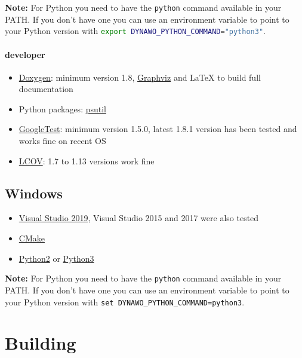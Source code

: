 \documentclass[a4paper, 12pt]{report}
\begin{document}
\textbf{Note:} For Python you need to have the \lstinline[language=bash]{python} command available in your PATH. If you don't have one you can use an environment variable to point to your Python version with \lstinline[language=bash]{export DYNAWO_PYTHON_COMMAND="python3"}.

\paragraph{\Dynawo developer}

\begin{itemize}
\item
  \href{http://www.doxygen.nl/}{Doxygen}: minimum version 1.8,
  \href{https://graphviz.readthedocs.io/en/stable/}{Graphviz} and LaTeX
  to build full documentation
\item
  Python packages:
  \href{https://psutil.readthedocs.io/en/latest/}{psutil}
\item
  \href{https://github.com/google/googletest}{GoogleTest}: minimum
  version 1.5.0, latest 1.8.1 version has been tested and works fine on
  recent OS
\item
  \href{http://ltp.sourceforge.net/coverage/lcov.php}{LCOV}: 1.7 to 1.13
  versions work fine
\end{itemize}

\subsection{Windows}

\begin{itemize}
\item
  \href{https://visualstudio.microsoft.com}{Visual Studio 2019}, Visual Studio 2015 and 2017 were also tested
\item
  \href{https://cmake.org}{CMake}
\item
  \href{https://www.python.org/ftp/python/2.7.18/python-2.7.18.amd64.msi}{Python2} or \href{https://www.python.org/ftp/python/3.8.2/python-3.8.2-amd64.exe}{Python3}
\end{itemize}

\textbf{Note:} For Python you need to have the \lstinline[language=bash]{python} command available in your PATH. If you don't have one you can use an environment variable to point to your Python version with \lstinline[language=command.com]{set DYNAWO_PYTHON_COMMAND=python3}.

\section[Building Dynawo]{Building \Dynawo}
\label{Dynawo_Installation_Documentation_Building_Dynawo}
\end{document}

